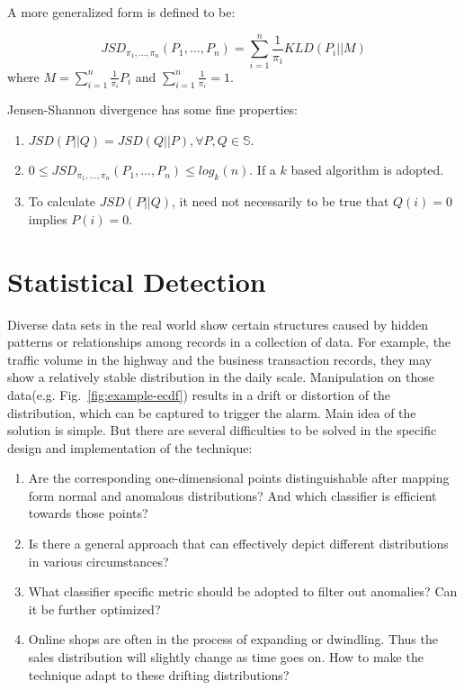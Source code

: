 \documentclass[10pt,conference,letterpaper]{IEEEtran}
\begin{document}
			A more generalized form is defined to be:
			
			\begin{equation}
				JSD_{\pi_1, \dots, \pi_n}(P_1, \dots, P_n) = \sum_{i=1}^{n}\frac{1}{\pi_i}KLD(P_i||M)
			\end{equation}
			where $\displaystyle M = \sum_{i=1}^{n}\frac{1}{\pi_i}P_i$ and $\displaystyle \sum_{i=1}^{n}\frac{1}{\pi_i} = 1$.
	
			Jensen-Shannon divergence has some fine properties:
			\begin{enumerate}
				\item $JSD(P||Q) = JSD(Q||P), \forall P, Q\in \mathbb{S}$.
				\item $0 \le JSD_{\pi_1, \dots, \pi_n}(P_1, \dots, P_n) \le log_k(n)$. If a $k$ based algorithm is adopted.
				\item To calculate $JSD(P||Q)$, it need not necessarily to be true that $Q(i)=0$ implies $P(i)=0$.
			\end{enumerate}
	
	\section{Statistical Detection}\label{sec:algorithm-details}
		Diverse data sets in the real world show certain structures caused by hidden patterns or relationships among records in a collection of data. For example, the traffic volume in the highway and the business transaction records, they may show a relatively stable distribution in the daily scale. Manipulation on those data(e.g. Fig.~\ref{fig:example-ecdf}) results in a drift or distortion of the distribution, which can be captured to trigger the alarm. Main idea of the solution is simple. But there are several difficulties to be solved in the specific design and implementation of the technique:
	
		\begin{enumerate}
			\item Are the corresponding one-dimensional points distinguishable after mapping form normal and anomalous distributions? And which classifier is efficient towards those points?
			\item Is there a general approach that can effectively depict different distributions in various circumstances?
			\item What classifier specific metric should be adopted to filter out anomalies? Can it be further optimized?
			\item Online shops are often in the process of expanding or dwindling. Thus the sales distribution will slightly change as time goes on. How to make the technique adapt to these drifting distributions?
		\end{enumerate}
	
\end{document}
